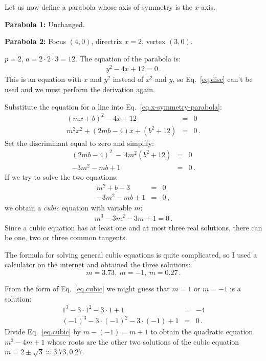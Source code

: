 \begin{example}\mbox{}

\noindent Let us now define a parabola whose axis of symmetry is the $x$-axis.

\noindent\textbf{Parabola 1:} Unchanged. 

\noindent\textbf{Parabola 2:} Focus $(4,0)$, directrix $x=2$, vertex $(3,0)$.

\noindent{}$p=2$, $a=2\cdot 2\cdot 3=12$. The equation of the parabola is:
\begin{align}
y^2-4x+12 = 0\,.\label{eq.x-symmetry-parabola}
\end{align}
This is an equation with $x$ and $y^2$ instead of $x^2$ and $y$, so Eq.~\ref{eq.disc} can't be used and we must perform the derivation again.

Substitute the equation for a line into Eq.~\ref{eq.x-symmetry-parabola}:
\begin{eqnarray*}
(mx+b)^2-4x+12&=&0\\
m^2x^2+(2mb-4)x+(b^2+12)&=&0\,.
\end{eqnarray*}
Set the discriminant equal to zero and simplify:
\begin{eqnarray*}
(2mb-4)^2\:-\:4m^2(b^2+12)&=&0\\
-3m^2-mb+1&=&0\,.
\end{eqnarray*}
If we try to solve the two equations:
\begin{eqnarray*}
m^2+b-3&=&0\\
-3m^2-mb+1&=&0\,,
\end{eqnarray*}
we obtain a \emph{cubic} equation with variable $m$:
\begin{align}
m^3-3m^2-3m+1=0\,.\label{eq.cubic}
\end{align}
Since a cubic equation has at least one and at most three real solutions, there can be one, two or three common tangents.

The formula for solving general cubic equations is quite complicated, so I used a calculator on the internet and obtained the three solutions:
\[m=3.73,\:m=-1,\:m=0.27\,.\]

\newpage

From the form of Eq.~\ref{eq.cubic} we might guess that $m=1$ or $m=-1$ is a solution:
\begin{eqnarray*}
1^3-3\cdot 1^2-3\cdot 1+1&=&-4\\
(-1)^3-3\cdot (-1)^2-3\cdot(-1)+1&=&0\,.
\end{eqnarray*}
Divide Eq.~\ref{eq.cubic} by $m-(-1)=m+1$ to obtain the quadratic equation $m^2-4m+1$ whose roots are the other two solutions of the cubic equation $m=2\pm\sqrt{3}\approx 3.73, 0.27$.
\end{example}


